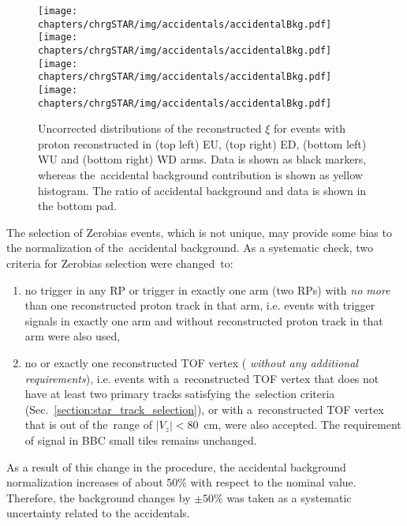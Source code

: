 \begin{figure}[h!]
	\centering
	\texttt{[image: chapters/chrgSTAR/img/accidentals/accidentalBkg.pdf]}
	\texttt{[image: chapters/chrgSTAR/img/accidentals/accidentalBkg.pdf]}
	\texttt{[image: chapters/chrgSTAR/img/accidentals/accidentalBkg.pdf]}
	\texttt{[image: chapters/chrgSTAR/img/accidentals/accidentalBkg.pdf]}
	\caption{Uncorrected distributions of the reconstructed $\xi$ for events with proton reconstructed in  (top left) EU, (top right) ED, (bottom left) WU and (bottom right) WD arms. Data is shown as black markers, whereas the~accidental background contribution is shown as yellow histogram.  The ratio of accidental background and data is shown in the bottom pad.}
	\label{fig:STARaccidentalsXi}
\end{figure}

The selection of Zerobias events, which is not unique, may provide some bias to the normalization of the~accidental background. As a systematic check, two criteria for  Zerobias selection were changed~to:
 \begin{enumerate}
 	\item no trigger in any RP or trigger in exactly one arm (two RPs) with \textit{no more} than one reconstructed proton track in that arm, i.e. events with trigger signals in exactly one arm and without reconstructed proton track in that arm were also used,
 	\item no  or exactly one reconstructed TOF vertex (%
 	\textit{without any additional requirements}), i.e. events with a~reconstructed TOF vertex that does not have at least two primary tracks satisfying the~selection criteria (Sec.~\ref{section:star_track_selection}), or with a~reconstructed TOF vertex that is out of the~range of $|V_z|<80$~cm, were also accepted. The requirement of signal in BBC small tiles remains unchanged. 
 \end{enumerate}
 As a result of this change in the procedure, %
 the accidental background normalization increases of about $50\%$ with respect to the nominal value. Therefore, the background changes by $\pm50\%$ was taken as a systematic uncertainty related to the accidentals.
 
